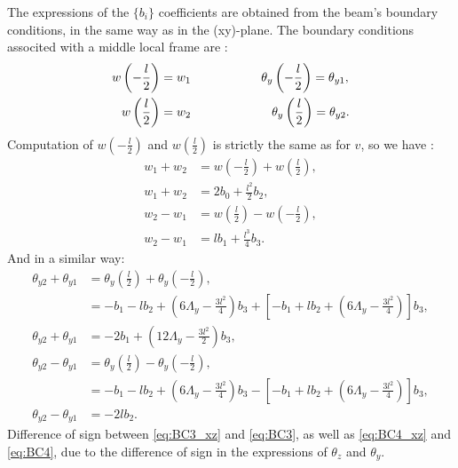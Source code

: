 \documentclass[a4paper,11pt]{article}
\begin{document}
\noindent The expressions of the $\{b_i\}$ coefficients are obtained from the
beam's boundary conditions, in the same way as in the (xy)-plane.
The boundary conditions associted with a middle local frame are :
\begin{align}
w\left(-\frac{l}{2}\right) & = w_1 \text{\hspace{20mm}} \theta_y \left(-\frac{l}{2}\right) = \theta_{y1}, \label{eq:BC_node_1_xz} \\
w\left(\frac{l}{2}\right) & = w_2 \text{\hspace{23mm}} \theta_y \left(\frac{l}{2}\right) = \theta_{y2}. \label{eq:BC_node_2_xz}
\end{align}
Computation of $w\left(-\frac{l}{2}\right)$ and $w\left(\frac{l}{2}\right)$ is
strictly the same as for $v$, so we have :
\begin{align}
w_1 + w_2 & = w\left(-\frac{l}{2}\right) + w\left(\frac{l}{2}\right), \nonumber \\
w_1 + w_2 & = 2b_0 + \frac{l^2}{2}b_2, \label{eq:BC1_xz}
\end{align}
\begin{align}
w_2 - w_1 & = w\left(\frac{l}{2}\right) - w\left(-\frac{l}{2}\right), \nonumber \\
w_2 - w_1 & = lb_1 + \frac{l^3}{4}b_3. \label{eq:BC2_xz}
\end{align}
And in a similar way:
\begin{align}
\theta_{y2} + \theta_{y1} & = \theta_y \left(\frac{l}{2}\right) + \theta_y \left(-\frac{l}{2}\right), \nonumber \\
	& =  -b_1 - l b_2 + \left( 6\Lambda_y - \frac{3l^2}{4} \right)b_3 + \left[-b_1 + l b_2 + \left( 6\Lambda_y - \frac{3l^2}{4}\right) \right] b_3, \nonumber \\
\theta_{y2} + \theta_{y1} & = -2b_1 + \left( 12\Lambda_y - \frac{3l^2}{2} \right)b_3, \label{eq:BC3_xz}
\end{align}
\begin{align}
\theta_{y2} - \theta_{y1} & = \theta_y \left(\frac{l}{2}\right) - \theta_y \left(-\frac{l}{2}\right), \nonumber \\
	& = -b_1 - l b_2 + \left( 6\Lambda_y - \frac{3l^2}{4} \right)b_3 - \left[-b_1 + l b_2 + \left( 6\Lambda_y - \frac{3l^2}{4}\right) \right] b_3, \nonumber \\
\theta_{y2} - \theta_{y1} & = -2lb_2. \label{eq:BC4_xz}
\end{align}
\textcolor{color2}{Difference of sign between \eqref{eq:BC3_xz} and \eqref{eq:BC3},
as well as \eqref{eq:BC4_xz} and \eqref{eq:BC4}, due to the difference of sign in
the expressions of $\theta_z$ and $\theta_y$.}\\
\end{document}
